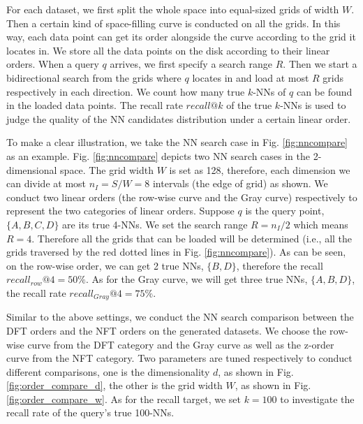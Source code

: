 \documentclass[twocolumn]{svjour3}          %
\begin{document}
For each dataset, we first split the whole space into equal-sized grids of width $W$. Then a certain kind of space-filling curve is conducted on all the grids. In this way, each data point can get its order alongside the curve according to the grid it locates in. We store all the data points on the disk according to their linear orders. 
When a query $q$ arrives, we first specify a search range $R$. Then we start a bidirectional search from the grids where $q$ locates in and load at most $R$ grids respectively in each direction. We count how many true $k$-NNs of $q$ can be found in the loaded data points. The recall rate $recall@k$ of the true $k$-NNs is used to judge the quality of the NN candidates distribution under a certain linear order.


To make a clear illustration, we take the NN search case in Fig. \ref{fig:nncompare} as an example. Fig. \ref{fig:nncompare} depicts two NN search cases in the 2-dimensional space. The grid width $W$ is set as 128, therefore, each dimension we can divide at most $n_I=S/W=8$ intervals (the edge of grid) as shown. We conduct two linear orders (the row-wise curve and the Gray curve) respectively to represent the two categories of linear orders. 
Suppose $q$ is the query point, $\{A, B, C, D\}$ are its true 4-NNs. We set the search range $R=n_I/2$ which means $R=4$. Therefore all the grids that can be loaded will be determined (i.e., all the grids traversed by the red dotted lines in Fig. \ref{fig:nncompare}). As can be seen, on the row-wise order, we can get 2 true NNs, $\{B, D\}$, therefore the recall $recall_{row}@4=50\%$. As for the Gray curve, we will get three true NNs, $\{A, B, D\}$, the recall rate $recall_{Gray}@4=75\%$.

Similar to the above settings, we conduct the NN search comparison between the DFT orders and the NFT orders on the generated datasets. We choose the row-wise curve from the DFT category and the Gray curve as well as the z-order curve from the NFT category. 
Two parameters are tuned respectively to conduct different comparisons, one is the dimensionality $d$, as shown in Fig. \ref{fig:order_compare_d}, the other is the grid width $W$, as shown in Fig. \ref{fig:order_compare_w}.   As for the recall target, we set $k=100$ to investigate the recall rate of the query's true 100-NNs.
\end{document}
